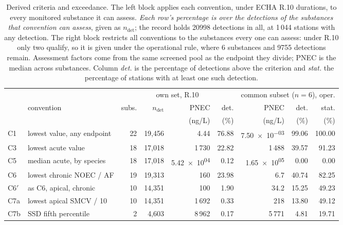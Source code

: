\begin{table}[t]
\centering
\scriptsize
\setlength{\tabcolsep}{2.0pt}
\caption{Derived criteria and exceedance. The left block applies each convention, under ECHA R.10 durations, to every monitored substance it can assess. \emph{Each row's percentage is over the detections of the substances that convention can assess}, given as $n_{\mathrm{det}}$; the record holds \num{20998} detections in all, at 1\,044 stations with any detection. The right block restricts all conventions to the substances every one can assess: under R.10 only two qualify, so it is given under the operational rule, where 6 substances and \num{9755} detections remain. Assessment factors come from the same screened pool as the endpoint they divide; PNEC is the median across substances. Column \emph{det.} is the percentage of detections above the criterion and \emph{stat.} the percentage of stations with at least one such detection.}
\label{tab:ladder}
\begin{tabular}{@{}ll rrrr rrr@{}}
\toprule
& & \multicolumn{4}{c}{own set, R.10} & \multicolumn{3}{c}{common subset ($n=6$), oper.}\\
\cmidrule(lr){3-6}\cmidrule(lr){7-9}
& convention & subs. & $n_{\mathrm{det}}$ & PNEC & det. & PNEC & det. & stat.\\
& & & & (ng/L) & (\%) & (ng/L) & (\%) & (\%)\\
\midrule
C1 & lowest value, any endpoint & 22 & 19,456 & 4.44 & 76.88 & \num{7.50e-03} & 99.06 & 100.00\\
C3 & lowest acute value & 18 & 17,018 & 1\,730 & 22.82 & 1\,488 & 39.57 & 91.23\\
C5 & median acute, by species & 18 & 17,018 & \num{5.42e+04} & 0.12 & \num{1.65e+05} & 0.00 & 0.00\\
C6 & lowest chronic NOEC / AF & 19 & 19,313 & 160 & 23.98 & 6.7 & 40.74 & 82.25\\
C6$'$ & as C6, apical, chronic & 10 & 14,351 & 100 & 1.90 & 34.2 & 15.25 & 49.23\\
C7a & lowest apical SMCV / 10 & 10 & 14,351 & 1\,692 & 0.33 & 218 & 13.80 & 49.12\\
C7b & SSD fifth percentile & 2 & 4,603 & 8\,962 & 0.17 & 5\,771 & 4.81 & 19.71\\
\bottomrule
\end{tabular}
\end{table}
